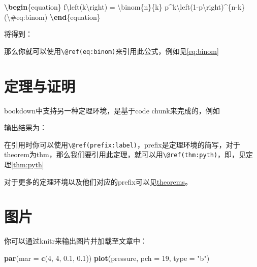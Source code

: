 \documentclass[singlesided]{Style/ucasthesis}%
\newenvironment{Shaded}{\begin{snugshade}}{\end{snugshade}}
\newcommand{\KeywordTok}[1]{\textcolor[rgb]{0.13,0.29,0.53}{\textbf{{#1}}}}
\newcommand{\DataTypeTok}[1]{\textcolor[rgb]{0.13,0.29,0.53}{{#1}}}
\newcommand{\DecValTok}[1]{\textcolor[rgb]{0.00,0.00,0.81}{{#1}}}
\newcommand{\FloatTok}[1]{\textcolor[rgb]{0.00,0.00,0.81}{{#1}}}
\newcommand{\SpecialCharTok}[1]{\textcolor[rgb]{0.00,0.00,0.00}{{#1}}}
\newcommand{\StringTok}[1]{\textcolor[rgb]{0.31,0.60,0.02}{{#1}}}
\newcommand{\SpecialStringTok}[1]{\textcolor[rgb]{0.31,0.60,0.02}{{#1}}}
\newcommand{\ExtensionTok}[1]{{#1}}
\newcommand{\NormalTok}[1]{{#1}}
\begin{document}
\begin{Shaded}
\begin{Highlighting}[]
\KeywordTok{\textbackslash{}begin}\NormalTok{\{}\ExtensionTok{equation}\NormalTok{\}}\SpecialStringTok{ }
\SpecialStringTok{  f}\SpecialCharTok{\textbackslash{}left}\SpecialStringTok{(k}\SpecialCharTok{\textbackslash{}right}\SpecialStringTok{) = }\SpecialCharTok{\textbackslash{}binom}\SpecialStringTok{\{n\}\{k\} p^k}\SpecialCharTok{\textbackslash{}left}\SpecialStringTok{(1-p}\SpecialCharTok{\textbackslash{}right}\SpecialStringTok{)^\{n-k\}}
\SpecialStringTok{  (}\SpecialCharTok{\textbackslash{}#}\SpecialStringTok{eq:binom)}
\KeywordTok{\textbackslash{}end}\NormalTok{\{}\ExtensionTok{equation}\NormalTok{\}}
\end{Highlighting}
\end{Shaded}

将得到：

那么你就可以使用\texttt{\textbackslash{}@ref(eq:binom)}来引用此公式，例如见\eqref{eq:binom}

\hypertarget{theorems-proof}{%
\section{定理与证明}\label{theorems-proof}}

bookdown中支持另一种定理环境，是基于code chunk来完成的，例如

输出结果为：

在引用时你可以使用\texttt{\textbackslash{}@ref(prefix:label)}，prefix是定理环境的简写，对于theorem为thm，那么我们要引用此定理，就可以用\texttt{\textbackslash{}@ref(thm:pyth)}，即，见定理\ref{thm:pyth}

对于更多的定理环境以及他们对应的prefix可以见\href{https://bookdown.org/yihui/bookdown/markdown-extensions-by-bookdown.html\#theorems}{theorems}。

\hypertarget{section-3}{%
\section{图片}\label{section-3}}

你可以通过knitr来输出图片并加载至文章中：

\begin{Shaded}
\begin{Highlighting}[]
\KeywordTok{par}\NormalTok{(}\DataTypeTok{mar =} \KeywordTok{c}\NormalTok{(}\DecValTok{4}\NormalTok{, }\DecValTok{4}\NormalTok{, }\FloatTok{0.1}\NormalTok{, }\FloatTok{0.1}\NormalTok{))}
\KeywordTok{plot}\NormalTok{(pressure, }\DataTypeTok{pch =} \DecValTok{19}\NormalTok{, }\DataTypeTok{type =} \StringTok{"b"}\NormalTok{)}
\end{Highlighting}
\end{Shaded}
\end{document}
